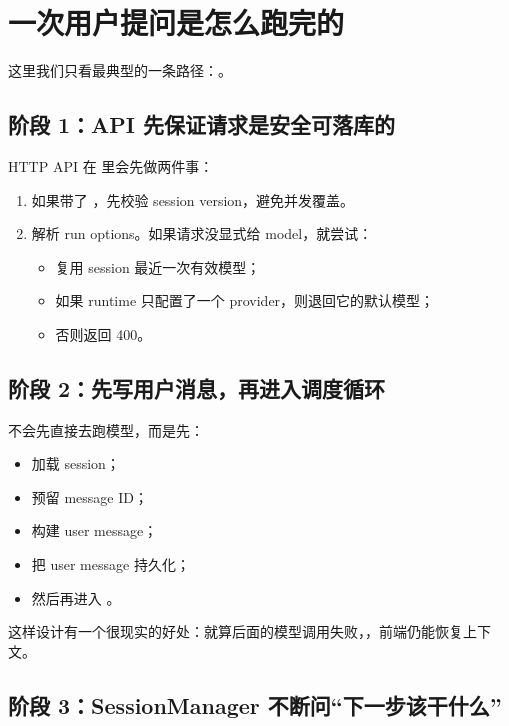\documentclass[11pt,a4paper]{ctexart}
\begin{document}
\section{一次用户提问是怎么跑完的}

这里我们只看最典型的一条路径：。

\subsection{阶段 1：API 先保证请求是安全可落库的}

HTTP API 在  里会先做两件事：

\begin{enumerate}
  \item 如果带了 ，先校验 session version，避免并发覆盖。
  \item 解析 run options。如果请求没显式给 model，就尝试：
  \begin{itemize}
    \item 复用 session 最近一次有效模型；
    \item 如果 runtime 只配置了一个 provider，则退回它的默认模型；
    \item 否则返回 400。
  \end{itemize}
\end{enumerate}

\subsection{阶段 2：先写用户消息，再进入调度循环}

 不会先直接去跑模型，而是先：

\begin{itemize}
  \item 加载 session；
  \item 预留 message ID；
  \item 构建 user message；
  \item 把 user message 持久化；
  \item 然后再进入 。
\end{itemize}

这样设计有一个很现实的好处：就算后面的模型调用失败，，前端仍能恢复上下文。

\subsection{阶段 3：SessionManager 不断问“下一步该干什么”}
\end{document}
